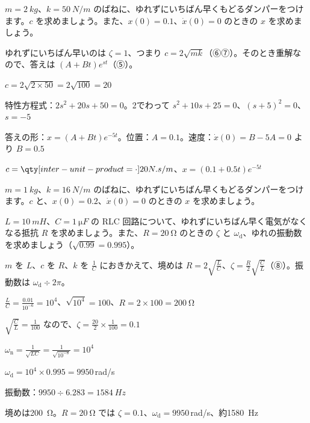 \begin{reidai}[ちょうどよいダンパー]
$m=\qty{2}{kg}$、$k=\qty{50}{N/m}$ のばねに、ゆれずにいちばん早くもどるダンパーをつけます。$c$ を求めましょう。また、$x(0)=0.1$、$\dot x(0)=0$ のときの $x$ を求めましょう。\par
\kangaekata ゆれずにいちばん早いのは $\zeta=1$、つまり $c=2\sqrt{mk}$（⑥⑦）。そのとき重解なので、答えは $(A+Bt)e^{st}$（⑤）。\par
\shiki $c=2\sqrt{2\times50}=2\sqrt{100}=20$\par
\bkvimq 特性方程式：$2s^2+20s+50=0$。2でわって $s^2+10s+25=0$、$(s+5)^2=0$、$s=-5$\par
\bkvimq 答えの形：$x=(A+Bt)e^{-5t}$。位置：$A=0.1$。速度：$\dot x(0)=B-5A=0$ より $B=0.5$\par
\kotae $c=\bkvimNsm{20}$、$x=(0.1+0.5t)e^{-5t}$
\end{reidai}

\begin{jibun}
$m=\qty{1}{kg}$、$k=\qty{16}{N/m}$ のばねに、ゆれずにいちばん早くもどるダンパーをつけます。$c$ と、$x(0)=0.2$、$\dot x(0)=0$ のときの $x$ を求めましょう。
\end{jibun}

\begin{reidai}
$L=\qty{10}{mH}$、$C=\qty{1}{\micro F}$ の RLC 回路について、ゆれずにいちばん早く電気がなくなる抵抗 $R$ を求めましょう。また、$R=\qty{20}{\ohm}$ のときの $\zeta$ と $\omega_{\mathrm d}$、ゆれの振動数を求めましょう（$\sqrt{0.99}=0.995$）。\par
\kangaekata $m$ を $L$、$c$ を $R$、$k$ を $\frac1C$ におきかえて、境めは $R=2\sqrt{\frac LC}$、$\zeta=\frac R2\sqrt{\frac CL}$（⑧）。振動数は $\omega_{\mathrm d}\div2\pi$。\par
\shiki $\frac LC=\frac{0.01}{10^{-6}}=10^4$、$\sqrt{10^4}=100$、$R=2\times100=\qty{200}{\ohm}$\par
\bkvimq $\sqrt{\frac CL}=\frac{1}{100}$ なので、$\zeta=\frac{20}{2}\times\frac{1}{100}=0.1$\par
\bkvimq $\omega_{\mathrm n}=\frac{1}{\sqrt{LC}}=\frac{1}{\sqrt{10^{-8}}}=10^4$\par
\bkvimq $\omega_{\mathrm d}=10^4\times0.995=9950$\,rad/s\par
\bkvimq 振動数：$9950\div6.283=\qty{1584}{Hz}$\par
\kotae 境めは\qty{200}{\ohm}。$R=\qty{20}{\ohm}$ では $\zeta=0.1$、$\omega_{\mathrm d}=9950$\,rad/s、約\qty{1580}{Hz}
\end{reidai}

